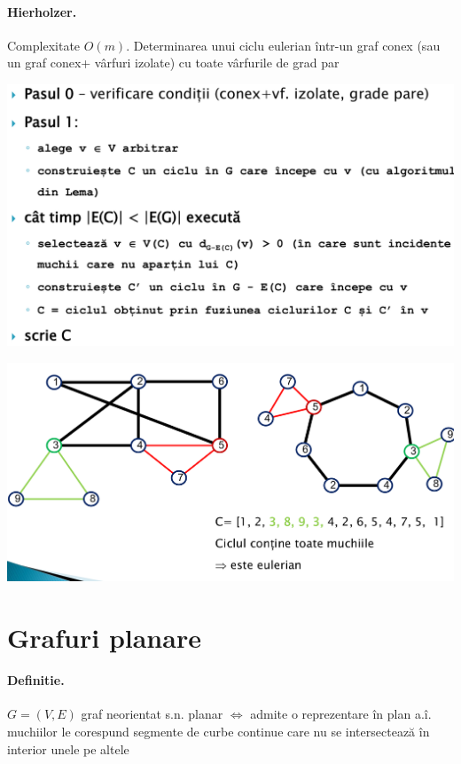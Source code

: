 \documentclass{article}
\begin{document}
\paragraph*{Hierholzer.} Complexitate $O(m)$. Determinarea unui ciclu eulerian într-un graf conex (sau un
graf conex+ vârfuri izolate) cu toate vârfurile de grad par
\begin{center}
    \includegraphics[scale=0.3]{12_hierholzer.png}
\end{center}
\begin{center}
    \includegraphics[scale=0.3]{13_hierholzer_graf.png}
\end{center}

\section{Grafuri planare}
\paragraph*{Definitie.} $G = (V, E)$ graf neorientat s.n. planar $\Leftrightarrow$ admite o reprezentare în plan a.î. muchiilor le corespund segmente de curbe continue care nu se intersectează în interior unele pe altele
\end{document}
